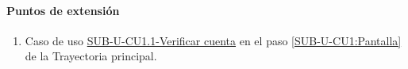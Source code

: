 
\paragraph{Puntos de extensión} \label{SUB-U-CU1:P}
\begin{enumerate}[label=PE\arabic*.]
	\item Caso de uso \hyperref[SUB-U-CU1.1]{SUB-U-CU1.1-Verificar cuenta} en el paso \ref{SUB-U-CU1:Pantalla} de la Trayectoria principal.
\end{enumerate}
